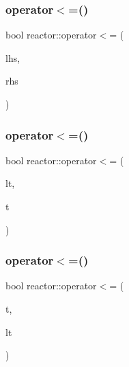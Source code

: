 \mbox{\label{namespacereactor_adb763d87ec4b89428e75916a5150da36}} 
\subsubsection{\texorpdfstring{operator$<$=()}{operator<=()}\hspace{0.1cm}{\footnotesize\ttfamily [1/3]}}
{\footnotesize\ttfamily bool reactor\+::operator$<$= (\begin{DoxyParamCaption}\item[{const \hyperlink{classreactor_1_1Tag}{Tag} \&}]{lhs,  }\item[{const \hyperlink{classreactor_1_1Tag}{Tag} \&}]{rhs }\end{DoxyParamCaption})\hspace{0.3cm}{\ttfamily [inline]}}

\mbox{\label{namespacereactor_a601c2be55dc826bea9a245045613ccc5}} 
\subsubsection{\texorpdfstring{operator$<$=()}{operator<=()}\hspace{0.1cm}{\footnotesize\ttfamily [2/3]}}
{\footnotesize\ttfamily bool reactor\+::operator$<$= (\begin{DoxyParamCaption}\item[{const \hyperlink{classreactor_1_1LogicalTime}{Logical\+Time} \&}]{lt,  }\item[{const \hyperlink{classreactor_1_1Tag}{Tag} \&}]{t }\end{DoxyParamCaption})\hspace{0.3cm}{\ttfamily [inline]}}

\mbox{\label{namespacereactor_a187a8a69a9cd1edb808e7c92a7a944a0}} 
\subsubsection{\texorpdfstring{operator$<$=()}{operator<=()}\hspace{0.1cm}{\footnotesize\ttfamily [3/3]}}
{\footnotesize\ttfamily bool reactor\+::operator$<$= (\begin{DoxyParamCaption}\item[{const \hyperlink{classreactor_1_1Tag}{Tag} \&}]{t,  }\item[{const \hyperlink{classreactor_1_1LogicalTime}{Logical\+Time} \&}]{lt }\end{DoxyParamCaption})\hspace{0.3cm}{\ttfamily [inline]}}

